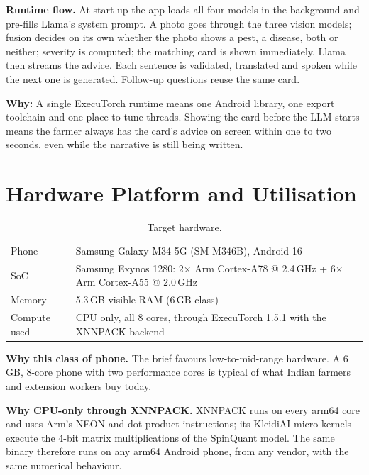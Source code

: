 \documentclass[11pt,a4paper]{article}
\newcommand{\why}[1]{\par\smallskip\noindent\colorbox{leaflight}{\parbox{\dimexpr\linewidth-2\fboxsep}{\small\textbf{\color{leaf}Why:} #1}}\par\smallskip}
\begin{document}
\textbf{Runtime flow.} At start-up the app loads all four models in the background and pre-fills Llama's system prompt.
A photo goes through the three vision models; fusion decides on its own whether the photo shows a pest, a disease, both or neither; severity is computed; the matching card is shown immediately. Llama then streams the
advice. Each sentence is validated, translated and spoken while the next one is generated. Follow-up questions reuse
the same card.

\why{A single ExecuTorch runtime means one Android library, one export toolchain and one place to tune threads.
Showing the card before the LLM starts means the farmer always has the card's advice on screen within one to two seconds,
even while the narrative is still being written.}

\section{Hardware Platform and Utilisation}

\begin{table}[h]
\centering\small
\begin{tabularx}{\linewidth}{@{}p{3.6cm}L@{}}
\toprule
Phone & Samsung Galaxy M34 5G (SM-M346B), Android 16 \\
SoC & Samsung Exynos 1280: 2× Arm Cortex-A78 @ 2.4\,GHz + 6× Arm Cortex-A55 @ 2.0\,GHz \\
Memory & 5.3\,GB visible RAM (6\,GB class) \\
Compute used & CPU only, all 8 cores, through ExecuTorch 1.5.1 with the XNNPACK backend \\
\bottomrule
\end{tabularx}
\caption{Target hardware.}
\end{table}

\textbf{Why this class of phone.} The brief favours low-to-mid-range hardware. A 6\,GB, 8-core phone with two
performance cores is typical of what Indian farmers and extension workers buy today.

\textbf{Why CPU-only through XNNPACK.} XNNPACK runs on every arm64 core and uses Arm's NEON and dot-product
instructions; its KleidiAI micro-kernels execute the 4-bit matrix multiplications of the SpinQuant model. The same
binary therefore runs on any arm64 Android phone, from any vendor, with the same numerical behaviour.
\end{document}
